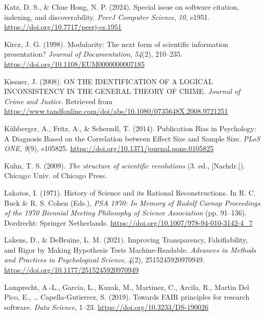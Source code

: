\documentclass[
  man, noextraspace,floatsintext]{apa6}
\newlength{\cslhangindent}
\newenvironment{CSLReferences}[2] %
 {\begin{list}{}{%
  \setlength{\itemindent}{0pt}
  \setlength{\leftmargin}{0pt}
  \setlength{\parsep}{0pt}
  \ifodd #1
   \setlength{\leftmargin}{\cslhangindent}
   \setlength{\itemindent}{-1\cslhangindent}
  \fi
  \setlength{\itemsep}{#2\baselineskip}}}
 {\end{list}}
\begin{document}
\begin{CSLReferences}{1}{0}
Katz, D. S., \& Chue Hong, N. P. (2024). Special issue on software citation, indexing, and discoverability. \emph{PeerJ Computer Science}, \emph{10}, e1951. \url{https://doi.org/10.7717/peerj-cs.1951}

Kircz, J. G. (1998). Modularity: The next form of scientific information presentation? \emph{Journal of Documentation}, \emph{54}(2), 210--235. \url{https://doi.org/10.1108/EUM0000000007185}

Kissner, J. (2008). {ON THE IDENTIFICATION OF A LOGICAL INCONSISTENCY IN THE GENERAL THEORY OF CRIME}. \emph{Journal of Crime and Justice}. Retrieved from \url{https://www.tandfonline.com/doi/abs/10.1080/0735648X.2008.9721251}

Kühberger, A., Fritz, A., \& Scherndl, T. (2014). Publication {Bias} in {Psychology}: {A Diagnosis Based} on the {Correlation} between {Effect Size} and {Sample Size}. \emph{PLoS ONE}, \emph{9}(9), e105825. \url{https://doi.org/10.1371/journal.pone.0105825}

Kuhn, T. S. (2009). \emph{The structure of scientific revolutions} (3. ed., {[}Nachdr.{]}). Chicago: Univ. of Chicago Press.

Lakatos, I. (1971). History of {Science} and its {Rational Reconstructions}. In R. C. Buck \& R. S. Cohen (Eds.), \emph{{PSA} 1970: {In Memory} of {Rudolf Carnap Proceedings} of the 1970 {Biennial Meeting Philosophy} of {Science Association}} (pp. 91--136). Dordrecht: Springer Netherlands. \url{https://doi.org/10.1007/978-94-010-3142-4_7}

Lakens, D., \& DeBruine, L. M. (2021). Improving {Transparency}, {Falsifiability}, and {Rigor} by {Making Hypothesis Tests Machine-Readable}. \emph{Advances in Methods and Practices in Psychological Science}, \emph{4}(2), 2515245920970949. \url{https://doi.org/10.1177/2515245920970949}

Lamprecht, A.-L., Garcia, L., Kuzak, M., Martinez, C., Arcila, R., Martin Del Pico, E., \ldots{} Capella-Gutierrez, S. (2019). Towards {FAIR} principles for research software. \emph{Data Science}, 1--23. \url{https://doi.org/10.3233/DS-190026}


\end{CSLReferences}
\end{document}
